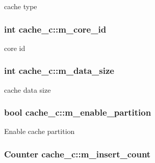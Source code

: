 \label{classcache__c_a5d3a5366674d862f4818e2980af21b50}
cache type \hypertarget{classcache__c_a22cdd0ba3fadb28f17b5648e8e66f4ab}{
\subsubsection[{m\_\-core\_\-id}]{\setlength{\rightskip}{0pt plus 5cm}int {\bf cache\_\-c::m\_\-core\_\-id}}}
\label{classcache__c_a22cdd0ba3fadb28f17b5648e8e66f4ab}
core id \hypertarget{classcache__c_a30907cdb4c4078c28d1210e535d1acdb}{
\subsubsection[{m\_\-data\_\-size}]{\setlength{\rightskip}{0pt plus 5cm}int {\bf cache\_\-c::m\_\-data\_\-size}}}
\label{classcache__c_a30907cdb4c4078c28d1210e535d1acdb}
cache data size \hypertarget{classcache__c_a6e6d8cf984f04bb1f3c9f52ffd758417}{
\subsubsection[{m\_\-enable\_\-partition}]{\setlength{\rightskip}{0pt plus 5cm}bool {\bf cache\_\-c::m\_\-enable\_\-partition}}}
\label{classcache__c_a6e6d8cf984f04bb1f3c9f52ffd758417}
Enable cache partition \hypertarget{classcache__c_a821cfa63e649cfd4695fbf8c91be4ff8}{
\subsubsection[{m\_\-insert\_\-count}]{\setlength{\rightskip}{0pt plus 5cm}Counter {\bf cache\_\-c::m\_\-insert\_\-count}}}
\label{classcache__c_a821cfa63e649cfd4695fbf8c91be4ff8}
